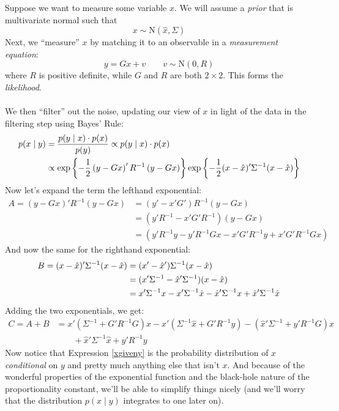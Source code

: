 \documentclass[a4paper,12pt]{scrartcl}
\begin{document}
Suppose we want to measure some variable $x$. We will 
assume a \emph{prior} that is multivariate normal such that
    \[ x \sim \text{N}(\hat{x}, \Sigma) \]
Next, we ``measure'' $x$ by matching it to an observable in
a \emph{measurement equation}:
    \[ y = G x + v \qquad v\sim \text{N}(0, R) \]
where $R$ is positive definite, while $G$ and $R$ are both 
$2 \times 2$. This forms the \emph{likelihood}.
\\
\\
We then ``filter'' out the noise, updating our view of $x$ in
light of the data in the filtering step using Bayes' Rule:
\begin{align}
    p(x \; | \; y) &= \frac{p(y \; | \; x) \cdot p(x)}{p(y)} 
    \propto p(y \; | \; x) \cdot p(x) \label{xgiveny} \\
    &\propto \exp\left\{-\frac{1}{2}
	\left( y - Gx \right)' R^{-1} \left(y-Gx\right)
	\right\} \exp\left\{-\frac{1}{2}( x - \hat{x} )' 
	\Sigma^{-1} (x-\hat{x})\right\} \notag
\end{align}
Now let's expand the term the lefthand exponential:
\begin{align*}
    A = \left( y - Gx \right)' R^{-1} \left(y-Gx\right) &= 
	\left( y' - x'G' \right) R^{-1} \left(y-Gx\right) \\
    &= \left( y'R^{-1} - x'G'R^{-1} \right)  \left(y-Gx\right) \\
    &= \left( y'R^{-1}y - y'R^{-1} Gx - x'G'R^{-1} y 
	+ x'G'R^{-1} Gx\right)
\end{align*}
And now the same for the righthand exponential:
\begin{align}
     B = ( x - \hat{x} )' \Sigma^{-1} (x-\hat{x}) 
	&= ( x' - \hat{x}' ) \Sigma^{-1} (x-\hat{x}) \notag\\
    &=  (x'\Sigma^{-1} - \hat{x}'\Sigma^{-1})   
	(x-\hat{x}) \notag \\
    &=  x'\Sigma^{-1} x - x'\Sigma^{-1} \hat{x} - 
	\hat{x}'\Sigma^{-1} x
	+ \hat{x}'\Sigma^{-1} \hat{x} \label{B}
\end{align}
Adding the two exponentials, we get:
\begin{align*}
    C = A + B &= x' \left( \Sigma^{-1} + G'R^{-1}G\right) x 
	- x' (\Sigma^{-1} \hat{x} + G'R^{-1}y)
	- (\hat{x}' \Sigma^{-1} + y' R^{-1}G) x  \\
	& \qquad + \hat{x}' \Sigma^{-1} \hat{x} + y' R^{-1} y 
\end{align*}
Now notice that Expression \ref{xgiveny} is the probability
distribution of $x$ \emph{conditional} on $y$ and pretty
much anything else that isn't $x$.  And because of the
wonderful properties of the exponential function and the
black-hole nature of the proportionality constant, we'll be
able to simplify things nicely (and we'll worry that the
distribution $p(x\;|\;y)$ integrates to one later on).  
\end{document}
